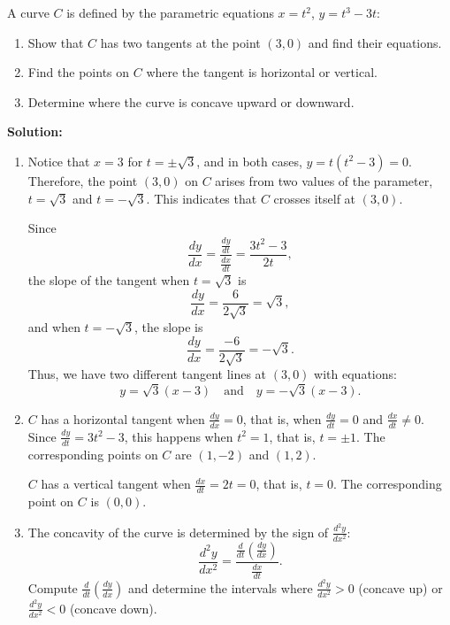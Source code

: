 \documentclass[12pt]{article}
\theoremstyle{beautifulthm}
\begin{document}
\begin{tcolorbox}[colback=examplebg, colframe=red!75!black, title=\textbf{EXAMPLE 3: Practice of Parametric Equations}, fonttitle=\bfseries, sharp corners]
A curve \( C \) is defined by the parametric equations \( x = t^2 \), \( y = t^3 - 3t \):
\begin{enumerate}
    \item[(a)] Show that \( C \) has two tangents at the point \( (3, 0) \) and find their equations.
    \item[(b)] Find the points on \( C \) where the tangent is horizontal or vertical.
    \item[(c)] Determine where the curve is concave upward or downward.
\end{enumerate}


\tcblower
\textbf{Solution:} 
\begin{enumerate}
    \item[(a)] Notice that \( x = 3 \) for \( t = \pm \sqrt{3} \), and in both cases, \( y = t(t^2 - 3) = 0 \). Therefore, the point \( (3, 0) \) on \( C \) arises from two values of the parameter, \( t = \sqrt{3} \) and \( t = -\sqrt{3} \). This indicates that \( C \) crosses itself at \( (3, 0) \).

    Since
    \[
    \frac{dy}{dx} = \frac{\frac{dy}{dt}}{\frac{dx}{dt}} = \frac{3t^2 - 3}{2t},
    \]
    the slope of the tangent when \( t = \sqrt{3} \) is
    \[
    \frac{dy}{dx} = \frac{6}{2\sqrt{3}} = \sqrt{3},
    \]
    and when \( t = -\sqrt{3} \), the slope is
    \[
    \frac{dy}{dx} = \frac{-6}{2\sqrt{3}} = -\sqrt{3}.
    \]
    Thus, we have two different tangent lines at \( (3, 0) \) with equations:
    \[
    y = \sqrt{3}(x - 3) \quad \text{and} \quad y = -\sqrt{3}(x - 3).
    \]

    \item[(b)] \( C \) has a horizontal tangent when \( \frac{dy}{dx} = 0 \), that is, when \( \frac{dy}{dt} = 0 \) and \( \frac{dx}{dt} \neq 0 \). Since \( \frac{dy}{dt} = 3t^2 - 3 \), this happens when \( t^2 = 1 \), that is, \( t = \pm 1 \). The corresponding points on \( C \) are \( (1, -2) \) and \( (1, 2) \).

    \( C \) has a vertical tangent when \( \frac{dx}{dt} = 2t = 0 \), that is, \( t = 0 \). The corresponding point on \( C \) is \( (0, 0) \).

    \item[(c)] The concavity of the curve is determined by the sign of \( \frac{d^2y}{dx^2} \):
    \[
    \frac{d^2y}{dx^2} = \frac{\frac{d}{dt}\left(\frac{dy}{dx}\right)}{\frac{dx}{dt}}.
    \]
    Compute \( \frac{d}{dt}\left(\frac{dy}{dx}\right) \) and determine the intervals where \( \frac{d^2y}{dx^2} > 0 \) (concave up) or \( \frac{d^2y}{dx^2} < 0 \) (concave down).
\end{enumerate}
\end{tcolorbox}
\end{document}
